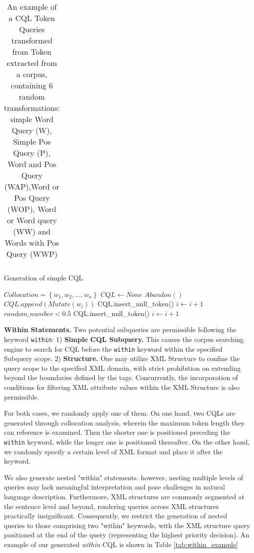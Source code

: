 \documentclass[11pt]{article}
\begin{document}
\begin{CJK*}{UTF8}{gbsn}
\begin{table}
\begin{tabular}{p{3em}p{15em}}
    \hline
    \end{tabular}
    \caption{An example of a CQL Token Queries transformed from Token extracted from a corpus, containing 6 random transformations: simple Word Query (W), Simple Pos Query (P), Word and Pos Query (WAP),Word or Pos Query (WOP), Word or Word query (WW) and Words with Pos Query (WWP)}
    \label{tab:simpleTokenExample}
\end{table}

\begin{algorithm}
\caption{Generation of simple CQL}\label{alg:cap}
\begin{algorithmic}
\Require $Collocation = \left\{ w_1, w_2, \ldots, w_n \right\}$
\State $CQL\gets None $ 
    \State $Abandon()$
\Else
    \State $CQL.append(Mutate(w_i))$
        \State CQL.insert\_null\_token()
        \State $i \gets i + 1$    
    \Else
        \If $random\_number \lt 0.5$
            \State CQL.insert\_null\_token()
        \EndIf
        \EndIf
    \State $i \gets i + 1$
\EndIf
\EndWhile
\end{algorithmic}
\end{algorithm}

\textbf{Within Statements. }
Two potential subqueries are permissible following the keyword \verb|within|:
 1) \textbf{Simple CQL Subquery.} This causes the corpus searching engine to search for CQL before the \verb|within| keyword within the specified Subquery scope. 
 2) \textbf{Structure.} One may utilize XML Structure to confine the query scope to the specified XML domain, with strict prohibition on extending beyond the boundaries defined by the tags. Concurrently, the incorporation of conditions for filtering XML attribute values within the XML Structure is also permissible. 

For both cases, we randomly apply one of them. On one hand, two CQLs are generated through collocation analysis, wherein the maximum token length they can reference is examined. Then the shorter one is positioned preceding the \verb|within| keyword, while the longer one is positioned thereafter. On the other hand, we randomly specify a certain level of XML format and place it after the keyword. 

We also generate nested "within" statements. however, nesting multiple levels of queries may lack meaningful interpretation and pose challenges in natural language description. Furthermore, XML structures are commonly segmented at the sentence level and beyond, rendering queries across XML structures practically insignificant. Consequently, we restrict the generation of nested queries to those comprising two "within" keywords, with the XML structure query positioned at the end of the query (representing the highest priority decision). An example of our generated \emph{within} CQL is shown in Table \ref{tab:within_example}


\end{CJK*}
\end{document}
